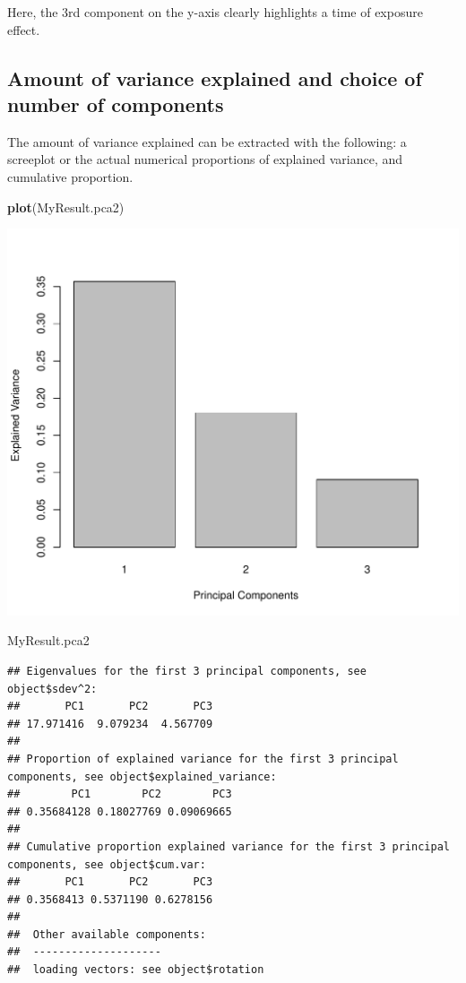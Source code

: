 \documentclass[]{book}
\newenvironment{Shaded}{\begin{snugshade}}{\end{snugshade}}
\newcommand{\KeywordTok}[1]{\textcolor[rgb]{0.13,0.29,0.53}{\textbf{#1}}}
\newcommand{\NormalTok}[1]{#1}
\begin{document}
Here, the 3rd component on the y-axis clearly highlights a time of exposure effect.

\hypertarget{amount-of-variance-explained-and-choice-of-number-of-components}{%
\subsection{Amount of variance explained and choice of number of components}\label{amount-of-variance-explained-and-choice-of-number-of-components}}

The amount of variance explained can be extracted with the following: a screeplot or the actual numerical proportions of explained variance, and cumulative proportion.

\begin{Shaded}
\begin{Highlighting}[]
\KeywordTok{plot}\NormalTok{(MyResult.pca2)}
\end{Highlighting}
\end{Shaded}

\begin{center}\includegraphics[width=0.5\linewidth,]{Figures/03-pca-liver-2-plot-1} \end{center}

\begin{Shaded}
\begin{Highlighting}[]
\NormalTok{MyResult.pca2}
\end{Highlighting}
\end{Shaded}

\begin{verbatim}
## Eigenvalues for the first 3 principal components, see object$sdev^2: 
##       PC1       PC2       PC3 
## 17.971416  9.079234  4.567709 
## 
## Proportion of explained variance for the first 3 principal components, see object$explained_variance: 
##        PC1        PC2        PC3 
## 0.35684128 0.18027769 0.09069665 
## 
## Cumulative proportion explained variance for the first 3 principal components, see object$cum.var: 
##       PC1       PC2       PC3 
## 0.3568413 0.5371190 0.6278156 
## 
##  Other available components: 
##  -------------------- 
##  loading vectors: see object$rotation
\end{verbatim}
\end{document}
